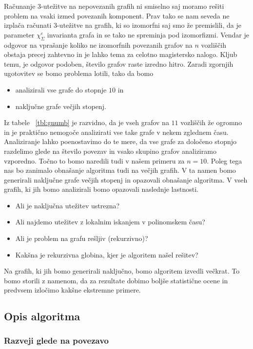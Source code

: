 \documentclass[12pt,a4paper,twoside]{article}
\theoremstyle{definition} %
\theoremstyle{plain} %
\newcommand{\ec}{\chi_{\Sigma}^e}
\numberwithin{equation}{section}  %
\begin{document}
 Računanje $3$-utežitve na nepovezanih grafih ni smiselno saj moramo rešiti problem na vsaki izmed povezanih komponent. Prav tako se nam seveda ne izplača računati $3$-utežitve na grafih, ki so izomorfni saj smo že premislili, da je parameter $\ec$ invarianta grafa in se tako ne spreminja pod izomorfizmi. Vendar je odgovor na vprašanje koliko ne izomorfnih povezanih grafov na $n$ vozliščih obstaja precej zahtevno in je lahko tema za celotno magistersko nalogo. Kljub temu, je odgovor podoben, število grafov raste izredno hitro. Zaradi zgornjih ugotovitev se bomo problema lotili, tako da bomo
\begin{itemize}
\item analizirali vse grafe do stopnje $10$ in
\item naključne grafe večjih stopenj.
\end{itemize}
Iz tabele ~\ref{tbl:gnumb} je razvidno, da je vseh grafov na $11$ vozliščih že ogromno in je praktično nemogoče analizirati vse take grafe v nekem zglednem času. Analiziranje lahko poenostavimo do te mere, da vse grafe za določeno stopnjo razdelimo glede na število povezav in vsako skupino grafov analiziramo vzporedno. Točno to bomo naredili tudi v našem primeru za $n=10$. Poleg tega nas bo zanimalo obnašanje algoritma tudi na večjih grafih. V ta namen bomo generirali naključne grafe večjih stopenj in opazovali obnašanje algoritma. V vseh grafih, ki jih bomo analizirali bomo opazovali naslednje lastnosti.
\begin{itemize}
\item Ali je naključna utežitev  ustrezna?
\item Ali najdemo utežitev z lokalnim iskanjem v polinomskem času?
\item Ali je problem na grafu rešljiv (rekurzivno)?
\item Kakšna je rekurzivna globina, kjer je algoritem našel rešitev?
\end{itemize}
Na grafih, ki jih bomo generirali naključno, bomo algoritem izvedli večkrat. To bomo storili z namenom, da za rezultate dobimo boljše statistične ocene in predvsem izločimo kakšne ekstremne primere.

\subsection{Opis algoritma}
\subsubsection{Razveji glede na povezavo}
\end{document}
